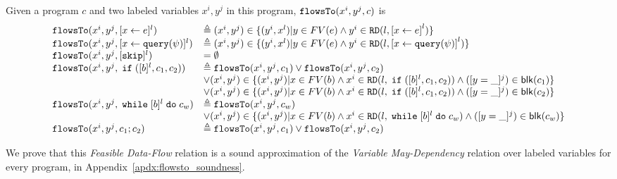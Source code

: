 \begin{defn}
  \label{def:feasible_flowsto}
  Given a program $c$ and two labeled variables $x^i, y^j$  in this program, 
  $\mathtt{flowsTo}(x^i, y^j, c)$ is 
    {\footnotesize
    \[
   \begin{array}{ll}
    \flowsto(x^i, y^j, \clabel{\assign{x}{\expr}}{}^l)  & \triangleq (x^i, y^j) \in \{ (y^i, x^l) | y \in FV(e) 
    \land y^i \in \live(l, \clabel{\assign{x}{\expr}}^l) \}  \\
    \flowsto(x^i, y^j, \clabel{\assign{x}{\query(\qexpr)}}{}^l)  & \triangleq (x^i, y^j) \in \{ (y^i, x^l) | y \in FV(e) 
    \land y^i \in \live(l,\clabel{\assign{x}{\query(\qexpr)}}^l) \}  \\
    \flowsto(x^i, y^j, [\eskip]^{l})  & = \emptyset \\
    \flowsto(x^i, y^j, \eif ([b]^l, c_1, c_2))  & \triangleq \flowsto(x^i, y^j, c_1) \lor \flowsto(x^i, y^j, c_2) \\ 
        & \lor (x^i, y^j) \in
       \{(x^i,y^j) | x \in FV(b) \land 
      x^i \in \live(l, \eif ([b]^l, c_1, c_2)) \land ([y = \_]^j) \in \mathsf{blk}(c_1) \} \\
       &\lor (x^i, y^j) \in \{(x^i,y^j) | x \in FV(b) \land 
      x^i\in \live(l, \eif ([b]^l, c_1, c_2)) \land ([y = \_]^j) \in \mathsf{blk}(c_2) \} \\
       \flowsto(x^i, y^j, \ewhile [b]^l \edo c_w)  & \triangleq  \flowsto(x^i, y^j, c_w) 
       \\ & 
       \lor (x^i, y^j) \in  \{(x^i,y^j) | x \in FV(b) \land 
      x^i \in \live(l,   \ewhile [b]^l \edo c_w) \land ([y = \_]^j) \in \mathsf{blk}(c_w) \} \\
       \flowsto(x^i, y^j, c_1 ;c_2)  & \triangleq \flowsto(x^i, y^j, c_1) \lor \flowsto(x^i, y^j, c_2) \\
   \end{array}
   \]
   }
   \end{defn}
%
We prove that this \emph{Feasible Data-Flow} relation is a sound approximation 
of the \emph{Variable May-Dependency} relation over labeled variables for every program,
in Appendix~\ref{apdx:flowsto_soundness}.
%
